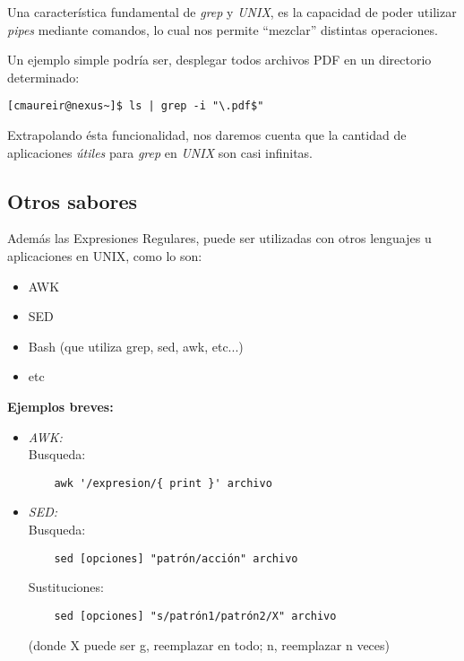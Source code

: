 Una característica fundamental de \emph{grep} y \emph{UNIX},
es la capacidad de poder utilizar \emph{pipes} mediante comandos,
lo cual nos permite ``mezclar'' distintas operaciones.

Un ejemplo simple podría ser,
desplegar todos archivos PDF en un directorio determinado:
\begin{verbatim}
[cmaureir@nexus~]$ ls | grep -i "\.pdf$" 
\end{verbatim}

Extrapolando ésta funcionalidad,
nos daremos cuenta que la cantidad de aplicaciones \emph{útiles}
para \emph{grep} en \emph{UNIX} son casi infinitas.

\subsection{Otros sabores}
Además las Expresiones Regulares,
puede ser utilizadas con otros lenguajes u aplicaciones en UNIX,
como lo son:
\begin{itemize}
	\item AWK
	\item SED
	\item Bash (que utiliza grep, sed, awk, etc...)
	\item etc
\end{itemize}

\textbf{Ejemplos breves:}\\
\begin{itemize}
	\item \emph{AWK:}\\
	Busqueda:
	\begin{verbatim}
	awk '/expresion/{ print }' archivo
	\end{verbatim}
	\item \emph{SED:}\\
	Busqueda:
	\begin{verbatim}
	sed [opciones] "patrón/acción" archivo
	\end{verbatim}
	Sustituciones:
	\begin{verbatim}
	sed [opciones] "s/patrón1/patrón2/X" archivo
	\end{verbatim}
	(donde X puede ser g, reemplazar en todo; n, reemplazar n veces)
\end{itemize}

